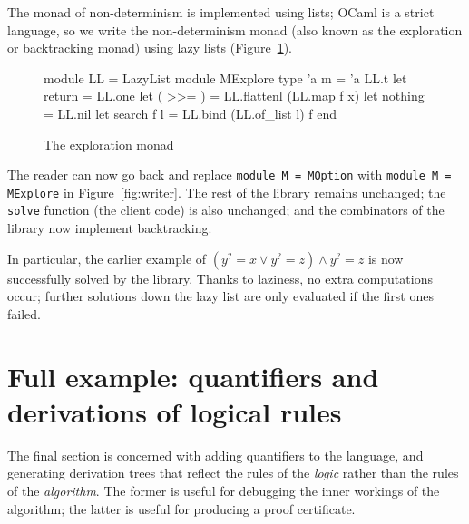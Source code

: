 \documentclass{easychair}
\def\li{\lstinline}
\newcommand{\fref}[1]{Figure~\ref{fig:#1}}
\newcommand{\f}[1]{\ensuremath{#1^?}} %
\begin{document}
The monad of non-determinism is implemented using lists; OCaml is a strict
language, so we write the non-determinism monad (also known as the exploration
or backtracking monad) using lazy lists (\fref{mexplore}).

\begin{figure}
  \centering
\begin{ocaml}
module LL = LazyList
module MExplore
  type 'a m = 'a LL.t
  let return = LL.one
  let ( >>= ) = LL.flattenl (LL.map f x)
  let nothing = LL.nil
  let search f l = LL.bind (LL.of_list l) f
end
\end{ocaml}
  \caption{The exploration monad}
  \label{fig:mexplore}
\end{figure}

The reader can now go back and replace \li+module M = MOption+ with
\li+module M = MExplore+ in \fref{writer}. The rest of the library remains
unchanged; the \li+solve+ function (the client code) is also unchanged; and the
combinators of the library now implement backtracking.

In particular, the earlier example of $(\f y = x \vee \f y = z) \wedge \f y = z$ is now successfully solved by the
library. Thanks to laziness, no extra computations occur; further solutions down
the lazy list are only evaluated if the first ones failed.

\section{Full example: quantifiers and derivations of logical rules}
\label{sec:generate-logical}

The final section is concerned with adding quantifiers to the language, and
generating derivation trees that reflect the rules of the \emph{logic} rather
than the rules of the \emph{algorithm}. The former is useful for debugging the
inner workings of the algorithm; the latter is useful for producing a proof
certificate.
\end{document}
